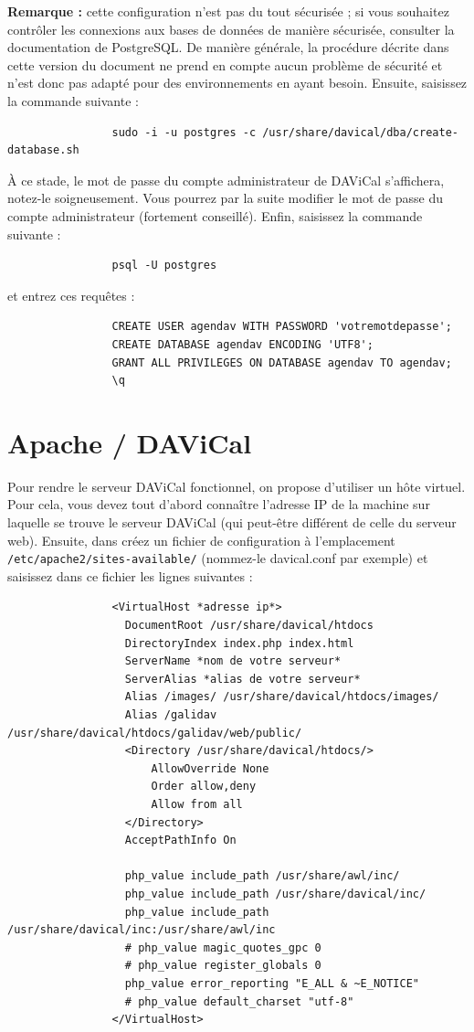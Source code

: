\documentclass[a4paper, 11pt]{report}
\begin{document}
			\textbf{Remarque :} cette configuration n’est pas du tout sécurisée ; si vous souhaitez contrôler les connexions aux bases de données de manière sécurisée, consulter la documentation de PostgreSQL. De manière générale, la procédure décrite dans cette version du document ne prend en compte aucun problème de sécurité et n’est donc pas adapté pour des environnements en ayant besoin. \newline
			Ensuite, saisissez la commande suivante :
			\begin{verbatim}
				sudo -i -u postgres -c /usr/share/davical/dba/create-database.sh
			\end{verbatim}

			À ce stade, le mot de passe du compte administrateur de DAViCal s’affichera, notez-le soigneusement. Vous pourrez par la suite modifier le mot de passe du compte administrateur (fortement conseillé).
			Enfin, saisissez la commande suivante :
			\begin{verbatim}
				psql -U postgres
			\end{verbatim}

			et entrez ces requêtes :
			\begin{verbatim}
				CREATE USER agendav WITH PASSWORD 'votremotdepasse';
				CREATE DATABASE agendav ENCODING 'UTF8';
				GRANT ALL PRIVILEGES ON DATABASE agendav TO agendav;
				\q
			\end{verbatim}

		\section{Apache / DAViCal}
			Pour rendre le serveur DAViCal fonctionnel, on propose d’utiliser un hôte virtuel. Pour cela, vous devez tout d’abord connaître l’adresse IP de la machine sur laquelle se trouve le serveur DAViCal (qui peut-être différent de celle du serveur web). Ensuite, dans créez un fichier de configuration à l’emplacement \texttt{/etc/apache2/sites-available/} (nommez-le davical.conf par exemple) et saisissez dans ce fichier les lignes suivantes :
			\begin{verbatim}
				<VirtualHost *adresse ip*>
				  DocumentRoot /usr/share/davical/htdocs
				  DirectoryIndex index.php index.html
				  ServerName *nom de votre serveur*
				  ServerAlias *alias de votre serveur*
				  Alias /images/ /usr/share/davical/htdocs/images/
				  Alias /galidav /usr/share/davical/htdocs/galidav/web/public/
				  <Directory /usr/share/davical/htdocs/>
				      AllowOverride None
				      Order allow,deny
				      Allow from all
				  </Directory>
				  AcceptPathInfo On

				  php_value include_path /usr/share/awl/inc/
				  php_value include_path /usr/share/davical/inc/
				  php_value include_path /usr/share/davical/inc:/usr/share/awl/inc
				  # php_value magic_quotes_gpc 0
				  # php_value register_globals 0
				  php_value error_reporting "E_ALL & ~E_NOTICE"
				  # php_value default_charset "utf-8"
				</VirtualHost>
			\end{verbatim}
\end{document}
